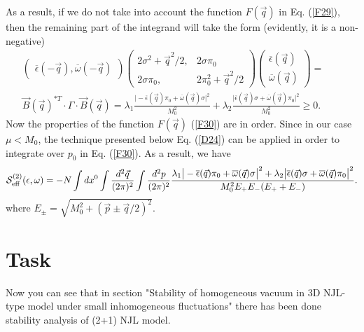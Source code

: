 \documentclass[12pt,a4paper]{article}
\begin{document}
As a result, if we do not take into account the function $F(\vec q)$ in Eq. (\ref{F29}),
then the remaining part of the integrand will take the form (evidently, it is a non-negative)
\begin{eqnarray}
\left (\begin{array}{c}
\overline \epsilon (-\vec q),
\overline \omega (-\vec q)
\end{array}\right )\left (\begin{array}{cc}
2\sigma^2+
\vec q^2/2,& 2\sigma\pi_0\\
2\sigma\pi_0,& 2\pi_0^2+\vec q^2/2
\end{array}\right )
\left (\begin{array}{cc}
\overline \epsilon (\vec q)\\
\overline \omega (\vec q)
\end{array}\right )=~~~~~~~~\nonumber\\
\vec B(\vec q)^{*T}\cdot\Gamma\cdot\vec B(\vec q)=
\lambda_1\frac{\big |-\overline \epsilon (\vec q)\pi_0+\overline \omega (\vec q)\sigma\big |^2}{M_0^2}+\lambda_2\frac{\big |\overline \epsilon (\vec q)\sigma+\overline \omega (\vec q)\pi_0\big |^2}{M_0^2}\ge 0.\label{F32}
\end{eqnarray}
Now the properties of the function $F(\vec q)$ (\ref{F30}) are in order. Since in our case $\mu<M_0$, the technique presented below Eq. (\ref{D24}) can be applied in order to integrate over $p_0$ in Eq. (\ref{F30}). As a result, we have
\begin{eqnarray}
{\cal S}^{(2)}_{\rm {eff}}(\epsilon,\omega)=-N\int dx^0\int \frac{d^2\vec q}{(2\pi)^2}\int \frac{d^2p}{(2\pi)^2}\frac{\lambda_1\big |-\overline \epsilon (\vec q)\pi_0+\overline \omega (\vec q)\sigma\big |^2+\lambda_2\big |\overline \epsilon (\vec q)\sigma+\overline \omega (\vec q)\pi_0\big |^2}{M_0^2E_+E_-(E_++E_-)}.
\label{F33}
\end{eqnarray}
where $E_\pm=\sqrt{M_0^2+(\vec p\pm\vec q/2)^2}$.


\section{Task}
Now you can see that in section "Stability of homogeneous vacuum in 3D NJL-type model under small inhomogeneous
fluctuations" there has been done stability analysis of (2+1) NJL model.
\end{document}
